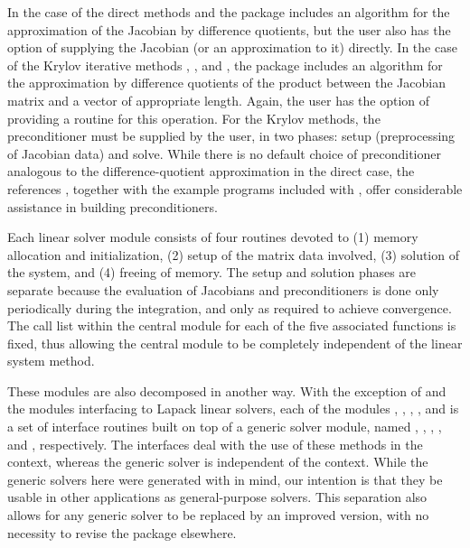 In the case of the direct methods {\cvdense} and {\cvband}
the package includes an algorithm for the approximation of the Jacobian by difference
quotients, but the user also has the option of supplying the Jacobian
(or an approximation to it) directly.  In the case of the Krylov iterative
methods {\cvspgmr}, {\cvspbcg}, and {\cvsptfqmr}, the package includes an algorithm
for the approximation by difference quotients of the product between the Jacobian
matrix and a vector of appropriate length. Again, the user has the option of
providing a routine for this operation.
For the Krylov methods, 
the preconditioner must be supplied by the user, in two phases: 
setup (preprocessing of Jacobian data) and solve.
While there is no default choice of
preconditioner analogous to the difference-quotient approximation
in the direct case, the references \cite{BrHi:89, Byr:92},
together with the example programs included with {\cvodes}, offer
considerable assistance in building preconditioners.

Each {\cvodes} linear solver module consists of four routines devoted to (1)
memory allocation and initialization, (2) setup of the matrix data
involved, (3) solution of the system, and (4) freeing of memory.  
The setup and solution phases are separate because the evaluation of
Jacobians and preconditioners is done only periodically during the
integration, and only as required to achieve convergence. The call list within
the central {\cvodes} module for each of the five associated functions is
fixed, thus allowing the central module to be completely independent
of the linear system method.

These modules are also decomposed in another way.
With the exception of {\cvdiag} and the modules interfacing to Lapack linear solvers,
each of the modules {\cvdense}, {\cvband}, {\cvspgmr}, {\cvspbcg}, and
{\cvsptfqmr} is a set of interface routines built on top of a generic solver
module, named {\dense}, {\band}, {\spgmr}, {\spbcg}, and {\sptfqmr}, respectively.
The interfaces deal with the use of these methods in the {\cvodes} context, 
whereas the generic solver is independent of the context.
While the generic solvers here were generated with {\sundials} in mind, our
intention is that they be usable in other applications as
general-purpose solvers.  This separation also allows for any generic
solver to be replaced by an improved version, with no necessity to
revise the {\cvodes} package elsewhere.

